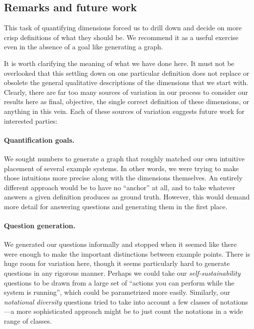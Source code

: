 \documentclass[english,submission]{programming}
\begin{document}
\hypertarget{remarks-and-future-work}{%
\subsection{Remarks and future work}\label{remarks-and-future-work}}

This task of quantifying dimensions forced us to drill down and decide
on more crisp definitions of what they should be. We recommend it as a
useful exercise even in the absence of a goal like generating a graph.

It is worth clarifying the meaning of what we have done here. It must
not be overlooked that this settling down on one particular definition
does not replace or obsolete the general qualitative descriptions of the
dimensions that we start with. Clearly, there are far too many sources
of variation in our process to consider our results here as final,
objective, the single correct definition of these dimensions, or
anything in this vein. Each of these sources of variation suggests
future work for interested parties:

\paragraph{Quantification goals.}

We sought numbers to generate a graph that roughly matched our own
intuitive placement of several example systems. In other words, we were
trying to make those intuitions more precise along with the dimensions
themselves. An entirely different approach would be to have no
``anchor'' at all, and to take whatever answers a given definition
produces as ground truth. However, this would demand more detail for
answering questions and generating them in the first place.

\paragraph{Question generation.}

We generated our questions informally and stopped when it seemed like
there were enough to make the important distinctions between example
points. There is huge room for variation here, though it seems
particularly hard to generate questions in any rigorous manner. Perhaps
we could take our \emph{self-sustainability} questions to be drawn from
a large set of ``actions you can perform while the system is running'',
which could be parametrized more easily. Similarly, our \emph{notational
diversity} questions tried to take into account a few classes of
notations---a more sophisticated approach might be to just count the
notations in a wide range of classes.
\end{document}
